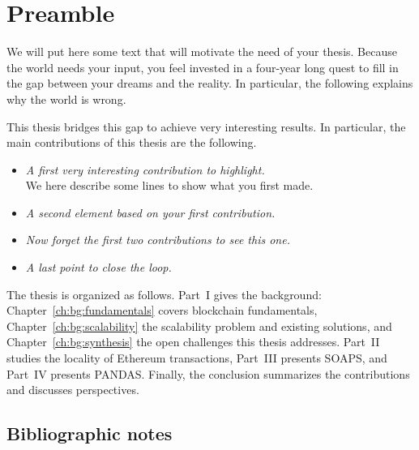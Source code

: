 \chapter*{Preamble}

We will put here some text that will motivate the need of your thesis.
Because the world needs your input, you feel invested in a four-year long quest to fill in the gap between your dreams and the reality.
In particular, the following explains why the world is wrong.

\lipsum[42]

This thesis bridges this gap to achieve very interesting results.
In particular, the main contributions of this thesis are the following.

\begin{itemize}
\item \textit{A first very interesting contribution to highlight.} \\

We here describe some lines to show what you first made.
\lipsum[2]

\item \textit{A second element based on your first contribution.} \\

\lipsum[5-6]

\item \textit{Now forget the first two contributions to see this one.} \\

\lipsum[9]

\item \textit{A last point to close the loop.} \\

\lipsum[13] 

\end{itemize}

The thesis is organized as follows.
Part~I gives the background: Chapter~\ref{ch:bg:fundamentals} covers blockchain fundamentals, Chapter~\ref{ch:bg:scalability} the scalability problem and existing solutions, and Chapter~\ref{ch:bg:synthesis} the open challenges this thesis addresses.
Part~II studies the locality of Ethereum transactions, Part~III presents SOAPS, and Part~IV presents PANDAS.
Finally, the conclusion summarizes the contributions and discusses perspectives.

\newpage

\section*{Bibliographic notes}

